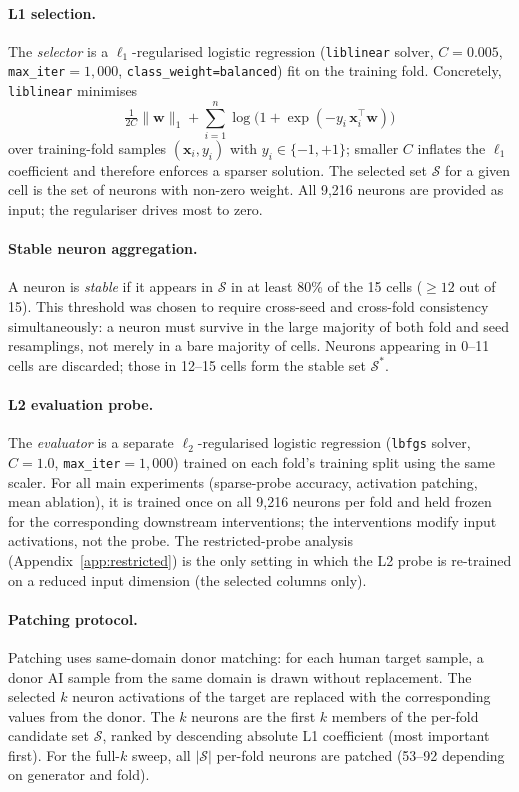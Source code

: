 \documentclass[11pt]{article}
\begin{document}
\paragraph{L1 selection.}
The \emph{selector} is a $\ell_1$-regularised logistic regression (\texttt{liblinear} solver, $C=0.005$, \texttt{max\_iter}$=1{,}000$, \texttt{class\_weight=balanced}) fit on the training fold. Concretely, \texttt{liblinear} minimises
\[
  \tfrac{1}{2C}\|\mathbf{w}\|_1
  + \sum_{i=1}^{n} \log\!\bigl(1 + \exp(-y_i\, \mathbf{x}_i^{\top}\mathbf{w})\bigr)
\]
over training-fold samples $(\mathbf{x}_i, y_i)$ with $y_i \in \{-1, +1\}$; smaller $C$ inflates the $\ell_1$ coefficient and therefore enforces a sparser solution. The selected set $\mathcal{S}$ for a given cell is the set of neurons with non-zero weight. All 9{,}216 neurons are provided as input; the regulariser drives most to zero.

\paragraph{Stable neuron aggregation.}
A neuron is \emph{stable} if it appears in $\mathcal{S}$ in at least 80\% of the 15 cells ($\geq 12$ out of 15). This threshold was chosen to require cross-seed and cross-fold consistency simultaneously: a neuron must survive in the large majority of both fold and seed resamplings, not merely in a bare majority of cells. Neurons appearing in 0--11 cells are discarded; those in 12--15 cells form the stable set $\mathcal{S}^{*}$.

\paragraph{L2 evaluation probe.}
The \emph{evaluator} is a separate $\ell_2$-regularised logistic regression (\texttt{lbfgs} solver, $C=1.0$, \texttt{max\_iter}$=1{,}000$) trained on each fold's training split using the same scaler. For all main experiments (sparse-probe accuracy, activation patching, mean ablation), it is trained once on all 9{,}216 neurons per fold and held frozen for the corresponding downstream interventions; the interventions modify input activations, not the probe. The restricted-probe analysis (Appendix~\ref{app:restricted}) is the only setting in which the L2 probe is re-trained on a reduced input dimension (the selected columns only).

\paragraph{Patching protocol.}
Patching uses same-domain donor matching: for each human target sample, a donor AI sample from the same domain is drawn without replacement. The selected $k$ neuron activations of the target are replaced with the corresponding values from the donor. The $k$ neurons are the first $k$ members of the per-fold candidate set $\mathcal{S}$, ranked by descending absolute L1 coefficient (most important first). For the full-$k$ sweep, all $|\mathcal{S}|$ per-fold neurons are patched (53--92 depending on generator and fold).
\end{document}
